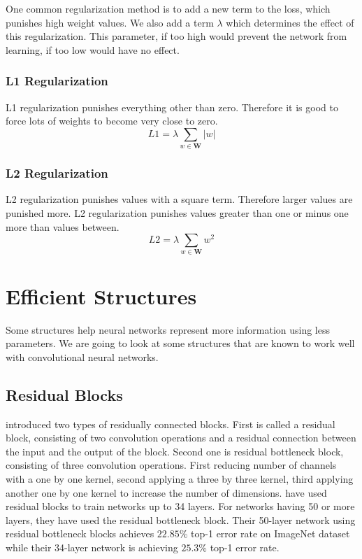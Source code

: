 One common regularization method is to add a new term to the loss, which punishes high weight values. We also add a term $\lambda$ which determines the effect of this regularization. This parameter, if too high would prevent the network from learning, if too low would have no effect. 

\subsubsection{L1 Regularization}
L1 regularization punishes everything other than zero. Therefore it is good to force lots of weights to become very close to zero.
$$ L1 = \lambda \sum_{w \in \mathbf{W}} |w| $$

\subsubsection{L2 Regularization}
L2 regularization punishes values with a square term. Therefore larger values are punished more. L2 regularization punishes values greater than one or minus one more than values between. 
$$ L2 = \lambda \sum_{w \in \mathbf{W}} w^2 $$

\section{Efficient Structures}
Some structures help neural networks represent more information using less parameters. We are going to look at some structures that are known to work well with convolutional neural networks.

\subsection{Residual Blocks}
\cite{He:2015aa} introduced two types of residually connected blocks. First is called a residual block, consisting of two convolution operations and a residual connection between the input and the output of the block. Second one is residual bottleneck block, consisting of three convolution operations. First reducing number of channels with a one by one kernel, second applying a three by three kernel, third applying another one by one kernel to increase the number of dimensions. \cite{He:2015aa} have used residual blocks to train networks up to 34 layers. For networks having 50 or more layers, they have used the residual bottleneck block. Their 50-layer network using residual bottleneck blocks achieves $22.85\%$ top-1 error rate on ImageNet dataset while their 34-layer network is achieving $25.3\%$ top-1 error rate.
\iffalse
